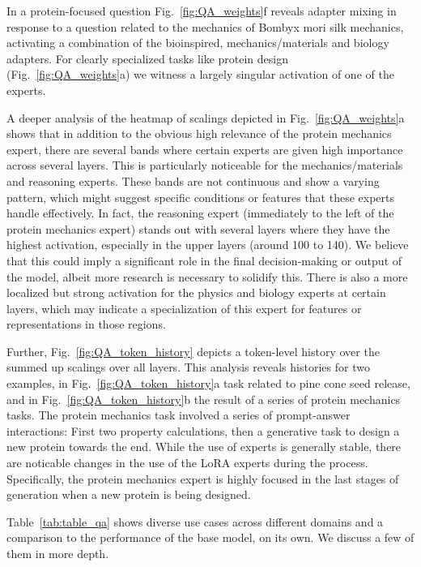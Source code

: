 In a protein-focused question Fig.~\ref{fig:QA_weights}f reveals adapter mixing in response to a question related to the mechanics of Bombyx mori silk mechanics, activating a combination of the bioinspired, mechanics/materials and biology adapters. For clearly specialized tasks like protein design (Fig.~\ref{fig:QA_weights}a) we witness a largely singular activation of one of the experts.  

A deeper analysis of the heatmap of scalings depicted in Fig.~\ref{fig:QA_weights}a shows that in addition to the obvious high relevance of the protein mechanics expert, there are several bands where certain experts are given high importance across several layers. This is particularly noticeable for the mechanics/materials and reasoning experts. These bands are not continuous and show a varying pattern, which might suggest specific conditions or features that these experts handle effectively. In fact, the reasoning expert (immediately to the left of the protein mechanics expert) stands out with several layers where they have the highest activation, especially in the upper layers (around 100 to 140). We believe that this could imply a significant role in the final decision-making or output of the model, albeit more research is necessary to solidify this. There is also a more localized but strong activation for the physics and biology experts at certain layers, which may indicate a specialization of this expert for features or representations in those regions.

Further, Fig.~\ref{fig:QA_token_history} depicts a token-level history over the summed up scalings over all layers. This analysis reveals histories for two examples, in Fig.~\ref{fig:QA_token_history}a task related to pine cone seed release, and in Fig.~\ref{fig:QA_token_history}b the result of a series of protein mechanics tasks. The protein mechanics task  involved a series of prompt-answer interactions: First two property calculations, then a generative task to design a new protein towards the end. While the use of experts is generally stable, there are noticable changes in the use of the LoRA experts during the process. Specifically, the protein mechanics expert is highly focused in the last stages of generation when a new protein is being designed. 




Table~\ref{tab:table_qa} shows diverse use cases across different domains and a comparison to the performance of the base model, on its own. We discuss a few of them in more depth.

